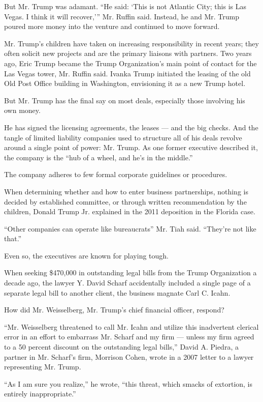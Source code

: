 But Mr. Trump was adamant. ``He said: `This is not Atlantic City; this
is Las Vegas. I think it will recover,''' Mr. Ruffin said. Instead, he
and Mr. Trump poured more money into the venture and continued to move
forward.

Mr. Trump's children have taken on increasing responsibility in recent
years; they often solicit new projects and are the primary liaisons with
partners. Two years ago, Eric Trump became the Trump Organization's main
point of contact for the Las Vegas tower, Mr. Ruffin said. Ivanka Trump
initiated the leasing of the old Old Post Office building in Washington,
envisioning it as a new Trump hotel.

But Mr. Trump has the final say on most deals, especially those
involving his own money.

He has signed the licensing agreements, the leases --- and the big
checks. And the tangle of limited liability companies used to structure
all of his deals revolve around a single point of power: Mr. Trump. As
one former executive described it, the company is the ``hub of a wheel,
and he's in the middle.''

The company adheres to few formal corporate guidelines or procedures.

When determining whether and how to enter business partnerships, nothing
is decided by established committee, or through written recommendation
by the children, Donald Trump Jr. explained in the 2011 deposition in
the Florida case.

``Other companies can operate like bureaucrats'' Mr. Tiah said.
``They're not like that.''

Even so, the executives are known for playing tough.

When seeking \$470,000 in outstanding legal bills from the Trump
Organization a decade ago, the lawyer Y. David Scharf accidentally
included a single page of a separate legal bill to another client, the
business magnate Carl C. Icahn.

How did Mr. Weisselberg, Mr. Trump's chief financial officer, respond?

``Mr. Weisselberg threatened to call Mr. Icahn and utilize this
inadvertent clerical error in an effort to embarrass Mr. Scharf and my
firm --- unless my firm agreed to a 50 percent discount on the
outstanding legal bills,'' David A. Piedra, a partner in Mr. Scharf's
firm, Morrison Cohen, wrote in a 2007 letter to a lawyer representing
Mr. Trump.

``As I am sure you realize,'' he wrote, ``this threat, which smacks of
extortion, is entirely inappropriate.''

